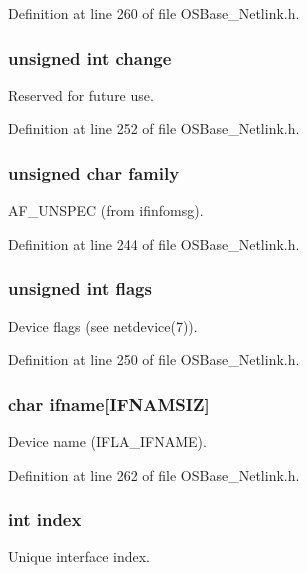 Definition at line 260 of file OSBase\_\-Netlink.h.\hypertarget{structnl_link_info_adda9fdcf309da55ca70fe8fa44228669}{
\subsubsection[{change}]{\setlength{\rightskip}{0pt plus 5cm}unsigned int {\bf change}}}
\label{structnl_link_info_adda9fdcf309da55ca70fe8fa44228669}
Reserved for future use. 

Definition at line 252 of file OSBase\_\-Netlink.h.\hypertarget{structnl_link_info_a6f1c3e3a98f91eb22d3bbb7ea4828c86}{
\subsubsection[{family}]{\setlength{\rightskip}{0pt plus 5cm}unsigned char {\bf family}}}
\label{structnl_link_info_a6f1c3e3a98f91eb22d3bbb7ea4828c86}
AF\_\-UNSPEC (from ifinfomsg). 

Definition at line 244 of file OSBase\_\-Netlink.h.\hypertarget{structnl_link_info_ac92588540e8c1d014a08cd8a45462b19}{
\subsubsection[{flags}]{\setlength{\rightskip}{0pt plus 5cm}unsigned int {\bf flags}}}
\label{structnl_link_info_ac92588540e8c1d014a08cd8a45462b19}
Device flags (see netdevice(7)). 

Definition at line 250 of file OSBase\_\-Netlink.h.\hypertarget{structnl_link_info_ac7b430acaa92a7a26fbcdad47d2efc20}{
\subsubsection[{ifname}]{\setlength{\rightskip}{0pt plus 5cm}char {\bf ifname}\mbox{[}IFNAMSIZ\mbox{]}}}
\label{structnl_link_info_ac7b430acaa92a7a26fbcdad47d2efc20}
Device name (IFLA\_\-IFNAME). 

Definition at line 262 of file OSBase\_\-Netlink.h.\hypertarget{structnl_link_info_a750b5d744c39a06bfb13e6eb010e35d0}{
\subsubsection[{index}]{\setlength{\rightskip}{0pt plus 5cm}int {\bf index}}}
\label{structnl_link_info_a750b5d744c39a06bfb13e6eb010e35d0}
Unique interface index. 

